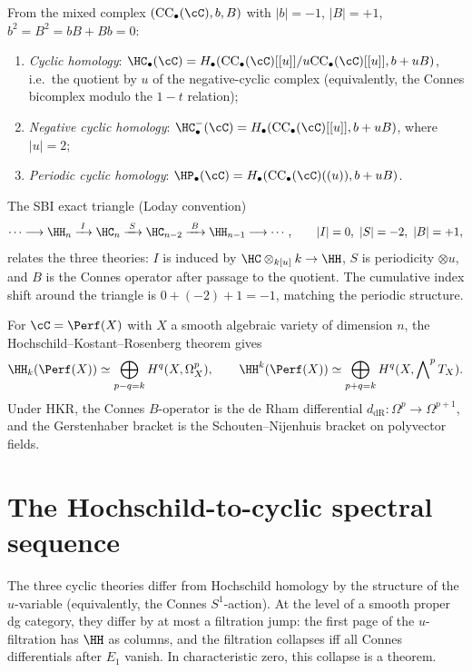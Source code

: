 \begin{definition}
\label{def:cyclic-homology-variants}
From the mixed complex $(\mathrm{CC}_\bullet(\cC), b, B)$
with $|b| = -1$, $|B| = +1$, $b^2 = B^2 = bB + Bb = 0$:
\begin{enumerate}[label=(\roman*)]
 \item \emph{Cyclic homology}:
 $\HC_\bullet(\cC) = H_\bullet(\mathrm{CC}_\bullet(\cC)[[u]] / u\mathrm{CC}_\bullet(\cC)[[u]], b + uB)$, i.e.\ the quotient by $u$ of the negative-cyclic complex (equivalently, the Connes bicomplex modulo the $1-t$ relation);
 \item \emph{Negative cyclic homology}:
 $\HC^-_\bullet(\cC) = H_\bullet(\mathrm{CC}_\bullet(\cC)[[u]], b + uB)$,
 where $|u| = 2$;
 \item \emph{Periodic cyclic homology}:
 $\HP_\bullet(\cC) = H_\bullet(\mathrm{CC}_\bullet(\cC)((u)), b + uB)$.
\end{enumerate}
The SBI exact triangle (Loday convention)
\[
 \cdots \longrightarrow \HH_n \xrightarrow{\; I \;} \HC_n \xrightarrow{\; S \;} \HC_{n-2} \xrightarrow{\; B \;} \HH_{n-1} \longrightarrow \cdots,
 \qquad |I|=0,\ |S|=-2,\ |B|=+1,
\]
relates the three theories: $I$ is induced by $\HC \otimes_{k[u]} k \to \HH$, $S$ is periodicity $\otimes u$, and $B$ is the Connes operator after passage to the quotient. The cumulative index shift around the triangle is $0 + (-2) + 1 = -1$, matching the periodic structure.
\end{definition}

\begin{example}
\label{ex:hkr}
For $\cC = \Perf(X)$ with $X$ a smooth algebraic variety of
dimension $n$, the Hochschild--Kostant--Rosenberg theorem gives
\[
 \HH_k(\Perf(X)) \simeq \bigoplus_{p-q=k} H^q(X, \Omega^p_X),
 \qquad
 \HH^k(\Perf(X)) \simeq \bigoplus_{p+q=k} H^q(X, \bigwedge\nolimits^p T_X).
\]
Under HKR, the Connes $B$-operator is the de Rham differential
$d_{\mathrm{dR}} \colon \Omega^p \to \Omega^{p+1}$, and the
Gerstenhaber bracket is the Schouten--Nijenhuis bracket on
polyvector fields.
\end{example}


\section{The Hochschild-to-cyclic spectral sequence}
\label{sec:hh-hc-spectral}

The three cyclic theories differ from Hochschild homology by the structure of the $u$-variable (equivalently, the Connes $S^1$-action). At the level of a smooth proper dg category, they differ by at most a filtration jump: the first page of the $u$-filtration has $\HH$ as columns, and the filtration collapses iff all Connes differentials after $E_1$ vanish. In characteristic zero, this collapse is a theorem.

